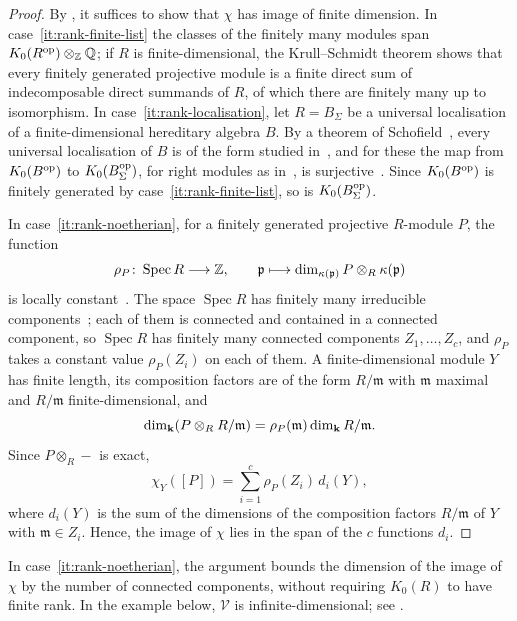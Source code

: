 \begin{proof}
  By , it suffices to show that $\chi$ has image
  of finite dimension. In case~\eqref{it:rank-finite-list} the classes of the
  finitely many modules span ${K_0(R^{\mathrm{op}})\otimes_{\mathbb{Z}}\mathbb{Q}}$; if $R$ is
  finite-dimensional, the Krull--Schmidt theorem shows that every finitely
  generated projective module is a finite direct sum of indecomposable direct
  summands of $R$, of which there are finitely many up to isomorphism. In
  case~\eqref{it:rank-localisation}, let ${R=B_\Sigma}$ be a universal
  localisation of a finite-dimensional hereditary algebra $B$. By a theorem of
  Schofield~\cite[Theorem~2.3]{Sch07a}, every universal localisation of $B$ is
  of the form studied in~\cite{Sch07a}, and for these the map from
  $K_0(B^{\mathrm{op}})$ to $K_0(B_\Sigma^{\mathrm{op}})$, for right modules as
  in~\cite{Sch07a}, is surjective~\cite[Lemma~4.1]{Sch07a}. Since
  $K_0(B^{\mathrm{op}})$ is finitely generated by case~\eqref{it:rank-finite-list}, so
  is $K_0(B_\Sigma^{\mathrm{op}})$.

  In case~\eqref{it:rank-noetherian}, for a finitely generated projective
  $R$-module $P$, the function
  \[
    \rho_P\colon\operatorname{Spec}R\longrightarrow\mathbb{Z},\qquad
    \mathfrak{p}\longmapsto
    \dim_{\kappa(\mathfrak{p})}P\otimes_R\kappa(\mathfrak{p})
  \]
  is locally constant~\cite[Tag~00NX, Lemma~10.78.2]{Stacks}. The space
  $\operatorname{Spec}R$ has finitely many irreducible
  components~\cite[Tag~00FR, Lemma~10.31.6]{Stacks}; each of them is connected
  and contained in a connected component, so $\operatorname{Spec}R$ has
  finitely many connected components $Z_1,\dots,Z_c$, and $\rho_P$ takes a
  constant value $\rho_P(Z_i)$ on each of them. A finite-dimensional module $Y$
  has finite length, its composition factors are of the form $R/\mathfrak{m}$
  with $\mathfrak{m}$ maximal and $R/\mathfrak{m}$ finite-dimensional, and
  \[
    \dim_{\mathbf{k}}(P\otimes_RR/\mathfrak{m})=\rho_P(\mathfrak{m})\dim_{\mathbf{k}}
    R/\mathfrak{m}.
  \]
  Since ${P\otimes_R-}$ is exact,
  \[
    \chi_Y([P])=\sum_{i=1}^c\rho_P(Z_i)\,d_i(Y),
  \]
  where $d_i(Y)$ is the sum of the dimensions of the composition factors
  $R/\mathfrak{m}$ of $Y$ with ${\mathfrak{m}\in Z_i}$. Hence, the image of
  $\chi$ lies in the span of the $c$ functions $d_i$.
\end{proof}

In case~\eqref{it:rank-noetherian}, the argument bounds the dimension of the
image of $\chi$ by the number of connected components, without requiring
$K_0(R)$ to have finite rank. In the example below, $\mathcal V$ is
infinite-dimensional; see .


